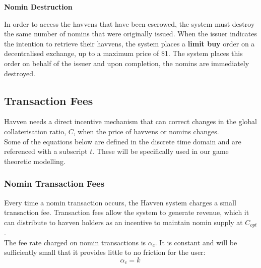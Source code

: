 \noindent \textbf{Nomin Destruction}

\vspace{1mm}

\noindent In order to access the havvens that have been escrowed, the system must destroy the same number of nomins that were originally issued. When the issuer indicates the intention to retrieve their havvens, the system places a \textbf{limit buy} order on a decentralised exchange, up to a maximum price of \$1. The system places this order on behalf of the issuer and upon completion, the nomins are immediately destroyed. \\

\newpage
\subsection{Transaction Fees} Havven needs a direct incentive mechanism that can correct changes in the global collaterisation ratio, $C$, when the price of havvens or nomins changes. \\

\noindent Some of the equations below are defined in the discrete time domain and are referenced with a subscript $t$. These will be specifically used in our game theoretic modelling.

\subsubsection{Nomin Transaction Fees} Every time a nomin transaction occurs, the Havven system charges a small transaction fee. Transaction fees allow the system to generate revenue, which it can distribute to havven holders as an incentive to maintain nomin supply at $C_{opt}$. \\

\noindent The fee rate charged on nomin transactions is $\alpha_c$. It is constant and will be sufficiently small that it provides little to no friction for the user: \\

\begin{equation}
\alpha_c = k \ \label{eq:5}
\end{equation}

\begin{center}
\end{center}

